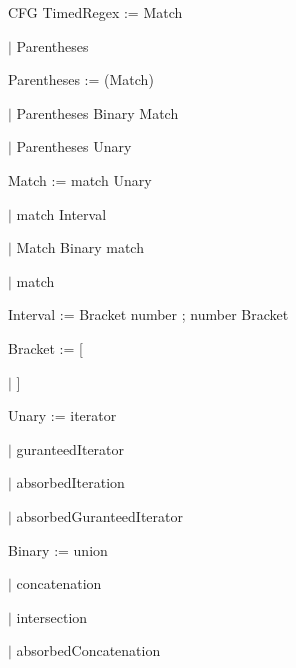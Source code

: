 
CFG
TimedRegex := Match

\qquad	$\mid$ Parentheses

Parentheses := (Match)

\qquad	$\mid$ Parentheses Binary Match

\qquad	$\mid$ Parentheses Unary

Match := match Unary

\qquad	$\mid$ match Interval

\qquad    $\mid$ Match Binary match

\qquad	$\mid$ match

Interval := Bracket number ; number Bracket

Bracket := [

\qquad	$\mid$ ]

Unary := iterator

\qquad	$\mid$ guranteedIterator

\qquad	$\mid$ absorbedIteration

\qquad	$\mid$ absorbedGuranteedIterator

Binary := union

\qquad	$\mid$ concatenation

\qquad	$\mid$ intersection

\qquad	$\mid$ absorbedConcatenation

